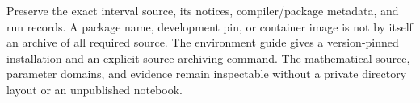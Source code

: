 \documentclass[11pt,a4paper]{article}
\theoremstyle{remark}\newtheorem*{contract}{Implementation contract}\newtheorem*{auditnote}{Audit note}
\begin{document}
Preserve the exact interval source, its notices, compiler/package metadata,
and run records. A package name, development pin, or container image is not
by itself an archive of all required source. The environment guide gives a
version-pinned installation and an explicit source-archiving command.
The mathematical source, parameter domains, and evidence remain inspectable
without a private directory layout or an unpublished notebook.
\end{document}
